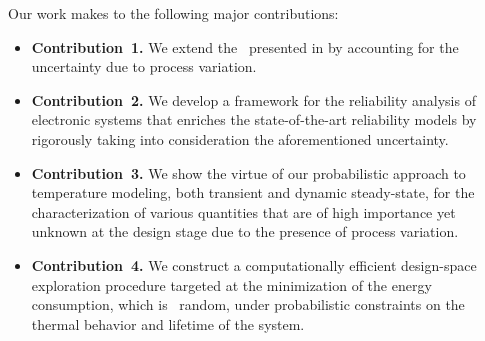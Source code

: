 Our work makes to the following major contributions:
\begin{itemize}
  \item {\bfseries Contribution~1.} We extend the \dssta\ presented in \cite{ukhov2012} by accounting for the uncertainty due to process variation.
  \item {\bfseries Contribution~2.} We develop a framework for the reliability analysis of electronic systems that enriches the state-of-the-art reliability models by rigorously taking into consideration the aforementioned uncertainty.
  \item {\bfseries Contribution~3.} We show the virtue of our probabilistic approach to temperature modeling, both transient and dynamic steady-state, for the characterization of various quantities that are of high importance yet unknown at the design stage due to the presence of process variation.
  \item {\bfseries Contribution~4.} We construct a computationally efficient design-space exploration procedure targeted at the minimization of the energy consumption, which is \apriori\ random, under probabilistic constraints on the thermal behavior and lifetime of the system.
\end{itemize}
